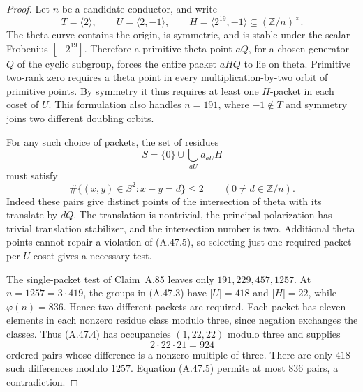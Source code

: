 \documentclass[11pt]{article}
\begin{document}
\begin{proof}
Let \(n\) be a candidate conductor, and write
\[
 T=\langle2\rangle,\qquad
 U=\langle2,-1\rangle,\qquad
 H=\langle2^{19},-1\rangle
       \subseteq(\mathbb Z/n)^\times.
\tag{A.47.3}
\]
The theta curve contains the origin, is symmetric, and is stable
under the scalar Frobenius \([-2^{19}]\). Therefore a primitive
theta point \(aQ\), for a chosen generator \(Q\) of the cyclic
subgroup, forces the entire packet \(aHQ\) to lie on theta.
Primitive two-rank zero requires a theta point in every
multiplication-by-two orbit of primitive points. By symmetry it
thus requires at least one \(H\)-packet in each coset of \(U\).
This formulation also handles \(n=191\), where \(-1\notin T\)
and symmetry joins two different doubling orbits.

For any such choice of packets, the set of residues
\[
                  S=\{0\}\cup\bigcup_{aU} a_{aU}H
\tag{A.47.4}
\]
must satisfy
\[
 \#\{(x,y)\in S^2:x-y=d\}\le2
                 \qquad(0\ne d\in\mathbb Z/n).
\tag{A.47.5}
\]
Indeed these pairs give distinct points of the intersection of
theta with its translate by \(dQ\). The translation is nontrivial,
the principal polarization has trivial translation stabilizer,
and the intersection number is two. Additional theta points cannot
repair a violation of (A.47.5), so selecting just one required
packet per \(U\)-coset gives a necessary test.

The single-packet test of Claim~A.85 leaves only
\(191,229,457,1257\). At \(n=1257=3\cdot419\), the groups
in (A.47.3) have \(|U|=418\) and \(|H|=22\), while
\(\varphi(n)=836\). Hence two different packets are required.
Each packet has eleven elements in each nonzero residue class
modulo three, since negation exchanges the classes. Thus (A.47.4)
has occupancies \((1,22,22)\) modulo three and supplies
\[
                   2\cdot22\cdot21=924
\]
ordered pairs whose difference is a nonzero multiple of three.
There are only \(418\) such differences modulo \(1257\).
Equation (A.47.5) permits at most \(836\) pairs, a contradiction.


\end{proof}
\end{document}
